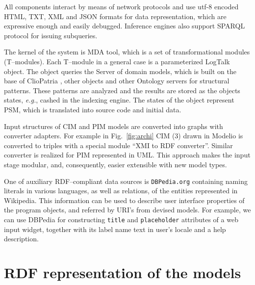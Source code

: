 \documentclass[conference]{IEEEtran}
\begin{document}
All components interact by means of network protocols and use utf-8 encoded HTML, TXT, XML and JSON formats for data representation, which are expressive enough and easily debugged.  Inference engines also support SPARQL protocol for issuing subqueries.

The kernel of the system is MDA tool, which is a set of transformational modules (T--modules). Each T--module in a general case is a parameterized LogTalk object.  The object queries the Server of domain models, which is built on the base of ClioPatria \cite{Clio}, other objects and other Ontology servers for structural patterns.  These patterns are analyzed and the results are stored as the objects states, \emph{e.g.}, cashed in the indexing engine.  The states of the object represent PSM, which is translated into source code and initial data.

Input structures of CIM and PIM models are converted into graphs with converter adapters.  For example in Fig.~\ref{fig:archi} CIM (3) drawn in Modelio \cite{modelio} is converted to triples with a special module ``XMI to RDF converter''.  Similar converter is realized for PIM represented in UML.  This approach makes the input stage modular, and, consequently, easier extensible with new model types.


One of auxiliary RDF--compliant data sources is \texttt{DBPedia.org} containing naming literals in various languages, as well as relations, of the entities represented in Wikipedia.  This information can be used to describe user interface properties of the program objects, and referred by URI's from devised models.  For example, we can use DBPedia for constructing \texttt{title} and \texttt{placeholder} attributes of a web input widget, together with its label name text in user's locale and a help description.


\section{RDF representation of the models}
\label{sec:rdf-repr}
\end{document}

